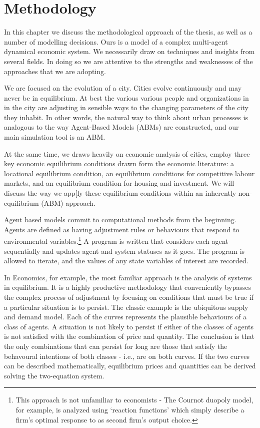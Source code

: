\chapter{Methodology} \label{chapter-methodology}

In this chapter we discuss the methodological approach of the thesis, as well as a number of modelling decisions. Ours is a  model of a complex multi-agent dynamical economic system. We necessarily draw on techniques and insights from several fields. In doing so we are attentive to the strengths and weaknesses of the approaches that we are adopting. 

We are focused on the evolution of a city. Cities evolve continuously and may never be in  equilibrium. At best the various various people and organizations in  in the city are adjusting in sensible ways to the changing parameters of the city they inhabit. In other words, the natural way to think about urban processes is analogous to the way Agent-Based Models (ABMs)  are constructed, and our main simulation tool is an ABM.

At the same time, we draws heavily on economic analysis of cities, employ three key economic equilibrium conditions drawn form the economic literature:  a locational equilibrium condition, an equilibrium conditions for competitive labour markets, and an equilibrium condition for housing and investment. We will discuss the way we app[ly  these equilibrium conditions within an inherently non-equilibrium (ABM) approach.

Agent based models commit to computational methods from the beginning. Agents are defined as having adjustment rules or behaviours that respond to environmental variables.\footnote{This approach is not unfamiliar to economists - The Cournot duopoly model, for example,  is analyzed using  `reaction functions' which simply describe a firm's optimal response to as second firm's output choice. } A program is written that considers each agent sequentially and updates agent and system statuses as it goes. The program is  allowed to iterate, and the values of any state variables of interest are recorded. 

In Economics, for example, the most familiar approach is the  analysis of systems in equilibrium. It is a highly productive methodology that conveniently  bypasses the complex process of adjustment by focusing on conditions that must be true if a particular situation is to persist. The classic example is the ubiquitous supply and demand model. Each of the curves represents the plausible behaviours of a class of agents. A  situation is not likely to persist if either of the classes of agents is not satisfied with the combination of price and quantity. The conclusion   is that the only combinations that can persist for long are  those that satisfy the behavoural intentions of both classes - i.e., are on both curves. If the two curves can be described mathematically, equilibrium prices and quantities can be derived solving the two-equation system.

